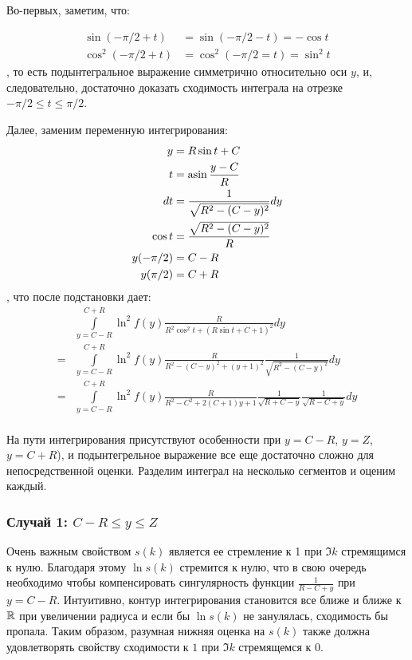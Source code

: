 Во-первых, заметим, что:

\begin{equation*}
\begin{aligned}
   \sin(-\pi/2 + t)   &= \sin(-\pi/2 - t) = - \cos t
\\ \cos^2(-\pi/2 + t) &= \cos^2(-\pi/2 = t) = \sin^2 t
\end{aligned}
\end{equation*}
, то есть подынтегральное выражение симметрично относительно оси $y$, и, следовательно, достаточно доказать сходимость интеграла на отрезке $-\pi/2 \le t \le \pi/2$.

Далее, заменим переменную интегрирования:
\begin{equation*}
\begin{aligned}
   y         &= R \sin t + C
\\ t         &= \asin \frac{y - C}{R}
\\ dt        &= \frac{1}{\sqrt{R^2 - (C - y)^2}} dy
\\ \cos t    &= \frac{\sqrt{R^2 - (C - y)^2}}{R}
\\ y(-\pi/2) &= C - R 
\\ y(\pi/2)  &= C + R 
\end{aligned}
\end{equation*}
, что после подстановки дает:
\begin{align*}
    & \int\limits_{y = C - R}^{C + R} \ln^2 f(y) \frac{R}{R^2 \cos^2 t + (R \sin t + C + 1)^2} dy \\
=   & \int\limits_{y = C - R}^{C + R} \ln^2 f(y) \frac{R}{R^2 - (C - y)^2 + (y + 1)^2} \frac{1}{\sqrt{R^2 - (C - y)^2}} dy\\
=   & \int\limits_{y = C - R}^{C + R} \ln^2 f(y) \frac{R}{R^2 - C^2 + 2 (C + 1) y + 1} \frac{1}{\sqrt{R + C - y}} \frac{1}{\sqrt{R - C + y}}  dy\\
\end{align*}

На пути интегрирования присутствуют особенности при $y = C - R$, $y = Z$, $y = C + R$), и подынтегрельное выражение все еще достаточно сложно для непосредственной оценки. Разделим интеграл на несколько сегментов и оценим каждый.

\subsubsection{Случай 1: $C - R \le y \le Z$}
Очень важным свойством $s(k)$ является ее стремление к 1 при $\Im k$ стремящимся к нулю. Благодаря этому $\ln s(k)$ стремится к нулю, что в свою очередь необходимо чтобы компенсировать сингулярность функции $\frac{1}{R - C + y}$ при $y = C - R$. Интуитивно, контур интегрирования становится все ближе и ближе к $\mathbb{R}$ при увеличении радиуса и если бы $\ln s(k)$ не занулялась, сходимость бы пропала. Таким образом, разумная нижняя оценка на $s(k)$ также должна удовлетворять свойству сходимости к $1$ при $\Im k$ стремящемся к $0$.

